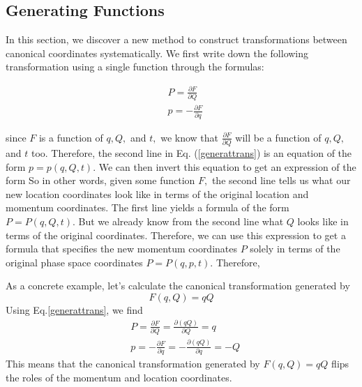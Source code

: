 \subsection{Generating Functions}
In this section, we discover a new method to construct transformations between canonical coordinates systematically. We first write down the following transformation using a single function  through the formulas:
\begin{qt}
    \begin{equation}
\begin{aligned}
&P=\frac{\partial F}{\partial Q}\\
&p=-\frac{\partial F}{\partial q}
\end{aligned}
\label{generattrans}
\end{equation}
\end{qt}
since $F$ is a function of $q, Q,$ and $t,$ we know that $\frac{\partial F}{\partial Q}$ will be a function of $q, Q,$ and $t$ too. Therefore, the second line in Eq. (\ref{generattrans}) is an equation of the form $p=p(q, Q, t) .$ We can then invert this equation to get an expression of the form  So in other words, given some function $F,$ the second line tells us what our new location coordinates look like in terms of the original location and momentum coordinates. The first line yields a formula of the form $P=P(q, Q, t) .$ But we already know from the second line what $Q$ looks like in terms of the original coordinates. Therefore, we can use this expression to get a formula that specifies the new momentum coordinates $P$ solely in terms of the original phase space coordinates $P=P(q, p, t)$. Therefore, 

As a concrete example, let’s calculate the canonical transformation generated by
\begin{equation}
F(q, Q)=q Q
\end{equation}
Using Eq.\ref{generattrans}, we find
\begin{equation}
\begin{aligned}
&P=\frac{\partial F}{\partial Q}=\frac{\partial(q Q)}{\partial Q}=q\\
&p=-\frac{\partial F}{\partial q}=-\frac{\partial(q Q)}{\partial q}=-Q
\end{aligned}
\end{equation}
This means that the canonical transformation generated by $F(q, Q)=q Q$ flips the roles of the momentum and location coordinates.

